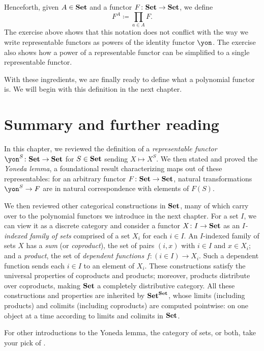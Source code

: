 \documentclass[Book-Poly]{subfiles}
\begin{document}
Henceforth, given $A\in\mathbf{Set}$ and a functor $F\colon\mathbf{Set}\to\mathbf{Set}$, we define
\[
F^A\coloneqq\prod_{a\in A}F.
\]
The exercise above shows that this notation does not conflict with the way we write representable functors as powers of the identity functor $\yon$.
The exercise also shows how a power of a representable functor can be simplified to a single representable functor.

With these ingredients, we are finally ready to define what a polynomial functor is.
We will begin with this definition in the next chapter.

\section{Summary and further reading}

In this chapter, we reviewed the definition of a \emph{representable functor} $\yon^S\colon\smset\to\smset$ for $S\in\mathbf{Set}$ sending $X\mapsto X^S$.
We then stated and proved the \emph{Yoneda lemma}, a foundational result characterizing maps out of these representables: for an arbitrary functor $F\colon\mathbf{Set}\to\mathbf{Set}$, natural transformations $\yon^S\to F$ are in natural correspondence with elements of $F(S)$.

We then reviewed other categorical constructions in $\mathbf{Set}$, many of which carry over to the polynomial functors we introduce in the next chapter.
For a set $I$, we can view it as a discrete category and consider a functor $X\colon I\to\mathbf{Set}$ as an \emph{$I$-indexed family of sets} comprised of a set $X_i$ for each $i\in I$.
An $I$-indexed family of sets $X$ has a \emph{sum} (or \emph{coproduct}), the set of pairs $(i,x)$ with $i\in I$ and $x\in X_i$; and a \emph{product}, the set of \emph{dependent functions} $f\colon(i\in I)\to X_i$.
Such a dependent function sends each $i\in I$ to an element of $X_i$.
These constructions satisfy the universal properties of coproducts and products; moreover, products distribute over coproducts, making $\mathbf{Set}$ a completely distributive category.
All these constructions and properties are inherited by $\mathbf{Set}^{\mathbf{Set}}$, whose limits (including products) and colimits (including coproducts) are computed pointwise: on one object at a time according to limits and colimits in $\mathbf{Set}$.

For other introductions to the Yoneda lemma, the category of sets, or both, take your pick of \cite{Pierce:1991,Borceux:1994a,MacLane:1998a,Leinster:2014a,Riehl:2017a,fong2019seven,cheng_2022}.
\end{document}
